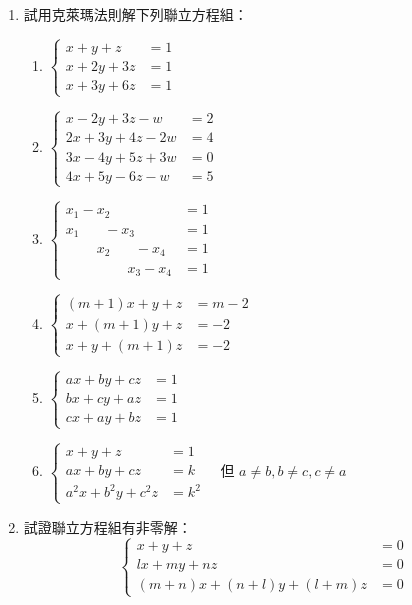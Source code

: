 \begin{enumerate}[label=\arabic*., leftmargin=2em]
  \item 試用克萊瑪法則解下列聯立方程組：
  \begin{enumerate}[label=(\roman*)]
    \item $\left\{\begin{aligned}
    x+y+z &= 1 \\
    x+2y+3z &= 1 \\
    x+3y+6z &= 1
    \end{aligned}\right.$
    \item $\left\{\begin{aligned}
    x-2y+3z-w &= 2 \\
    2x+3y+4z-2w &= 4 \\
    3x-4y+5z+3w &= 0 \\
    4x+5y-6z-w &= 5
    \end{aligned}\right.$
    \item $\left\{\begin{aligned}
    x_1-x_2 \phantom{+ x_3 - x_4} &= 1 \\
    x_1 \phantom{- x_2} - x_3 \phantom{- x_4} &= 1 \\
    \phantom{x_1 +} x_2 \phantom{- x_3} - x_4 &= 1 \\
    \phantom{x_1 + x_2 +} x_3 - x_4 &= 1
    \end{aligned}\right.$
    \item $\left\{\begin{aligned}
    (m+1)x + y + z &= m-2 \\
    x + (m+1)y + z &= -2 \\
    x + y + (m+1)z &= -2
    \end{aligned}\right.$
    \item $\left\{\begin{aligned}
    ax+by+cz &= 1 \\
    bx+cy+az &= 1 \\
    cx+ay+bz &= 1
    \end{aligned}\right.$
    \item $\left\{\begin{aligned}
    x+y+z &= 1 \\
    ax+by+cz &= k \\
    a^2x+b^2y+c^2z &= k^2
    \end{aligned}\right. \quad \text{但 } a \ne b, b \ne c, c \ne a$
  \end{enumerate}

  \item 試證聯立方程組有非零解：
  \[ \left\{\begin{aligned}
  x+y+z &= 0 \\
  lx+my+nz &= 0 \\
  (m+n)x + (n+l)y + (l+m)z &= 0
  \end{aligned}\right. \]


\end{enumerate}
